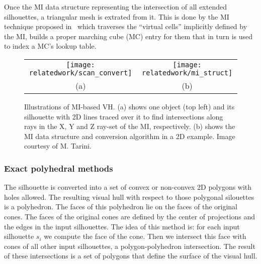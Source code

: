 Once the MI data structure representing the intersection of all extended silhouettes, a triangular mesh is extrated from it. This is done by the MI technique proposed in~\cite{rocchini2001marching} which traverses the ``virtual cells'' implicitly defined by the MI, builds a proper marching cube (MC) entry for them that in turn is used to index a MC's lookup table.
\begin{figure}[h]
\centering
\begin{tabular}{cc}
\texttt{[image: relatedwork/scan\_convert]}&
\texttt{[image: relatedwork/mi\_struct]}\\
(a) & (b)\\
\end{tabular}
\caption{Illustrations of MI-based VH. (a) shows one object (top left) and its silhouette with 2D lines traced over it to find intersections along rays in the X, Y and Z ray-set of the MI, respectively. (b) shows the MI data structure and conversion algorithm in a 2D example. Image courtesy of M. Tarini.}
\label{fig:robust_pc}
\end{figure}

\subsubsection{Exact polyhedral methods}
The silhouette is converted into a set of convex or non-convex 2D polygons with holes allowed. The resulting visual hull with respect to those polygonal silouettes is a polyhedron. The faces of this polyhedron lie on the faces of the original cones. The faces of the original cones are defined by the center of projections and the edges in the input silhouettes. The idea of this method is: for each input silhouette $s_i$ we compute the face of the cone. Then we intersect this face with cones of all other input silhouettes, \ie a polygon-polyhedron intersection. The result of these intersections is a set of polygons that define the surface of the visual hull.



